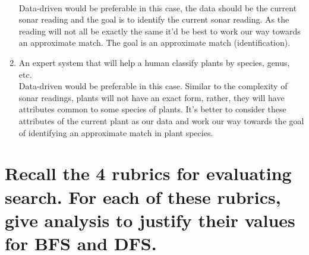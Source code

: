 \documentclass[11pt]{article}
\begin{document}
\begin{enumerate}
	\\ Data-driven would be preferable in this case, the data should be the current sonar reading and the goal is to identify the current sonar reading. As the reading will not all be exactly the same it'd be best to work our way towards an approximate match. The goal is an approximate match (identification).
	\item An expert system that will help a human classify plants by species, genus, etc.
	\\ Data-driven would be preferable in this case. Similar to the complexity of sonar readings, plants will not have an exact form, rather, they will have attributes common to some species of plants. It's better to consider these attributes of the current plant as our data and work our way towards the goal of identifying an approximate match in plant species.
\end{enumerate}

\section{Recall the 4 rubrics for evaluating search. For each of these rubrics, give analysis to justify their values for BFS and DFS.}
\end{document}

